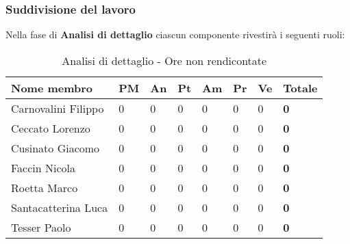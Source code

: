 		\subsubsection{Suddivisione del lavoro} %
		\label{ssub:suddivisione_del_lavoro}
		Nella fase di \textbf{Analisi di dettaglio} ciascun componente rivestirà i seguenti ruoli: \\
			\begin{table}[!h]
				\begin{center}
					\begin{tabularx}{0.9\textwidth}{|l|l|l|l|l|l|l|X|}
						\hline
						\textbf{Nome membro} & \textbf{PM} & \textbf{An} & \textbf{Pt} & \textbf{Am} & \textbf{Pr} & \textbf{Ve} & \textbf{Totale} \\
						\hline
						Carnovalini Filippo & 0 & 0 & 0 & 0 & 0 & 0 & \textbf{0} \\
						\hline
						Ceccato Lorenzo & 0 & 0 & 0 & 0 & 0 & 0 & \textbf{0} \\
						\hline
						Cusinato Giacomo & 0 & 0 & 0 & 0 & 0 & 0 & \textbf{0} \\
						\hline
						Faccin Nicola & 0 & 0 & 0 & 0 & 0 & 0 & \textbf{0} \\
						\hline
						Roetta Marco & 0 & 0 & 0 & 0 & 0 & 0 & \textbf{0} \\
						\hline
						Santacatterina Luca & 0 & 0 & 0 & 0 & 0 & 0 & \textbf{0} \\
						\hline
						Tesser Paolo & 0 & 0 & 0 & 0 & 0 & 0 & \textbf{0} \\
						\hline	
					\end{tabularx}
				\end{center}
			\caption{Analisi di dettaglio - Ore non rendicontate}
			\end{table}
		
